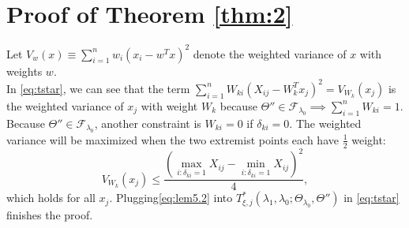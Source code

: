 \section{Proof of Theorem \ref{thm:2}}

    Let $V_{w}(x)\equiv\sum_{i=1}^nw_{i}\left(x_i-w^Tx\right)^2$ denote the weighted variance of $x$ with weights $w$.\\
    In \eqref{eq:tstar}, we can see that the term $\sum_{i=1}^nW_{ki}\left( X_{ij}-W_k^Tx_j\right)^2=V_{W_k}(x_j)$ is the weighted variance of $x_j$ with weight $W_k$ because $\Theta''\in\mathcal{F}_{\lambda_0}\implies\sum_{i=1}^nW_{ki}=1$. Because $\Theta''\in\mathcal{F}_{\lambda_0}$, another constraint is $W_{ki}=0$ if $\delta_{ki}=0$. The weighted variance will be maximized when the two extremist points each have $\frac{1}{2}$ weight:
    \begin{equation}
        \label{eq:lem5.2}
        V_{W_k}(x_j)\leq \frac{\left(\max_{i:\delta_{ki}=1}X_{ij}-\min_{i:\delta_{ki}=1}X_{ij}\right)^2}{4},
    \end{equation}
    which holds for all $x_j$. Plugging\eqref{eq:lem5.2} into $T^*_{\xi,j}(\lambda_1,\lambda_0;\Theta_{\lambda_0},\Theta'')$ in \eqref{eq:tstar} finishes the proof.







